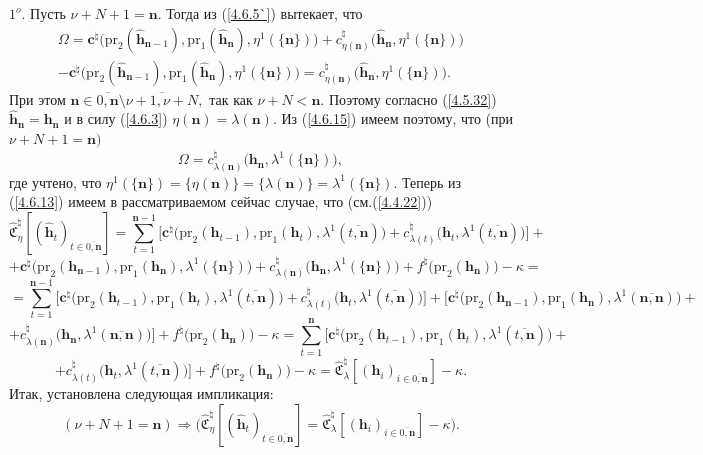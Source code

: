 \documentclass[12pt,twoside]{report}
\newcommand{\bfn}{\begin{equation}}
\newcommand{\efn}{\end{equation}}
\newcommand{\ov}{\overline}
\newcommand{\Om}{\Omega}
\newcommand{\la}{\lambda}
\newcommand{\zc}{{\mathbf c}}
\newcommand{\nn}{{\mathbf n}}
\begin{document}
{{ $1^o.$ Пусть $\nu+N+1 = \nn.$ Тогда из (\ref{4.6.5`}) вытекает, что
 \begin{eqnarray}
&\Om = \zc^\natural\bigl(\mathrm{pr}_2(\hat{\mathbf{h}}_{\nn-1}),\mathrm{pr}_1(\hat{\mathbf{h}}_\nn),
 \eta^1(\{\nn\})\bigl) + c_{\eta(\nn)}^\natural\bigl(\hat{\mathbf{h}}_\nn,\eta^1(\{\nn\})\bigl)
&\nonumber\\
&- \zc^\natural\bigl(\mathrm{pr}_2(\hat{\mathbf{h}}_{\nn-1}),\mathrm{pr}_1(\hat{\mathbf{h}}_\nn),
 \eta^1(\{\nn\})\bigl)=
 c_{\eta(\nn)}^\natural\bigl(\hat{\mathbf{h}}_\nn,\eta^1(\{\nn\})\bigl).
&\label{4.6.15}
\end{eqnarray}
При этом $\nn\in \ov{0,\nn}\setminus \ov{\nu+1,\nu+N},$ так как $\nu+N < \nn.$ Поэтому
согласно (\ref{4.5.32}) $\hat{\mathbf{h}}_\nn =\mathbf{h}_\nn$ и в силу (\ref{4.6.3})
$\eta(\nn) = \la(\nn).$ Из (\ref{4.6.15}) имеем поэтому, что (при $\nu+N+1 = \nn)$
$$\Om = c_{\la(\nn)}^\natural\bigl(\mathbf{h}_\nn,\la^1(\{\nn\})\bigl),
$$
где учтено, что $\eta^1(\{\nn\}) = \{\eta(\nn)\} = \{\la(\nn)\} = \la^1(\{\nn\}).$ Теперь из
(\ref{4.6.13}) имеем в рассматриваемом сейчас случае, что (см.(\ref{4.4.22}))
$$\widehat{\mathfrak{C}}_\eta^\natural[(\hat{\mathbf{h}}_t)_{t\in\ov{0,\nn}}]=
\sum\limits_{t=1}^{\nn-1}\bigl[\zc^\natural\bigl(\mathrm{pr}_2(\mathbf{h}_{t-1}),\mathrm{pr}_1
(\mathbf{h}_t),\la^1(\ov{t,\nn})\bigl)+ c_{\la(t)}^\natural\bigl(\mathbf{h}_t,\la^1(\ov{t,\nn})\bigl)\bigl] +
$$
$$+ \zc^\natural\bigl(\mathrm{pr}_2(\mathbf{h}_{\nn-1}),\mathrm{pr}_1
(\mathbf{h}_\nn),\la^1(\{\nn\})\bigl)+ c_{\la(\nn)}^\natural\bigl(\mathbf{h}_\nn,\la^1(\{\nn\})\bigl) +
f^\natural\bigl(\mathrm{pr}_2(\mathbf{h}_\nn)\bigl) -\kappa = $$
$$= \sum\limits_{t=1}^{\nn-1}\bigl[\zc^\natural\bigl(\mathrm{pr}_2(\mathbf{h}_{t-1}),\mathrm{pr}_1
(\mathbf{h}_t),\la^1(\ov{t,\nn})\bigl)+ c_{\la(t)}^\natural\bigl(\mathbf{h}_t,\la^1(\ov{t,\nn})\bigl)\bigl] +
\bigl[\zc^\natural\bigl(\mathrm{pr}_2(\mathbf{h}_{\nn-1}),\mathrm{pr}_1(\mathbf{h}_\nn),\la^1(\ov{\nn,\nn})
\bigl)+
$$
$$+ c_{\la(\nn)}^\natural\bigl(\mathbf{h}_\nn,\la^1(\ov{\nn,\nn})\bigl)\bigl] +
f^\natural\bigl(\mathrm{pr}_2(\mathbf{h}_\nn)\bigl) -\kappa =
\sum\limits_{t=1}^\nn\bigl[\zc^\natural\bigl(\mathrm{pr}_2(\mathbf{h}_{t-1}),\mathrm{pr}_1
(\mathbf{h}_t),\la^1(\ov{t,\nn})\bigl)+
$$
$$+ c_{\la(t)}^\natural\bigl(\mathbf{h}_t,\la^1(\ov{t,\nn})\bigl)\bigl] +
f^\natural\bigl(\mathrm{pr}_2(\mathbf{h}_\nn)\bigl) -\kappa =
\widehat{\mathfrak{C}}_\lambda^\natural[(\mathbf{h}_i)_{i\in\ov{0,\nn}}]-\kappa.
$$
Итак, установлена следующая импликация:
\bfn\label{4.6.16}
(\nu+N+1 =\nn)\Longrightarrow \bigl(\widehat{\mathfrak{C}}_\eta^\natural[(\hat{\mathbf{h}}_t)_{t\in\ov{0,\nn}}]=
\widehat{\mathfrak{C}}_\la^\natural[(\mathbf{h}_i)_{i\in\ov{0,\nn}}]-\kappa\bigl).
\efn

}}
\end{document}
